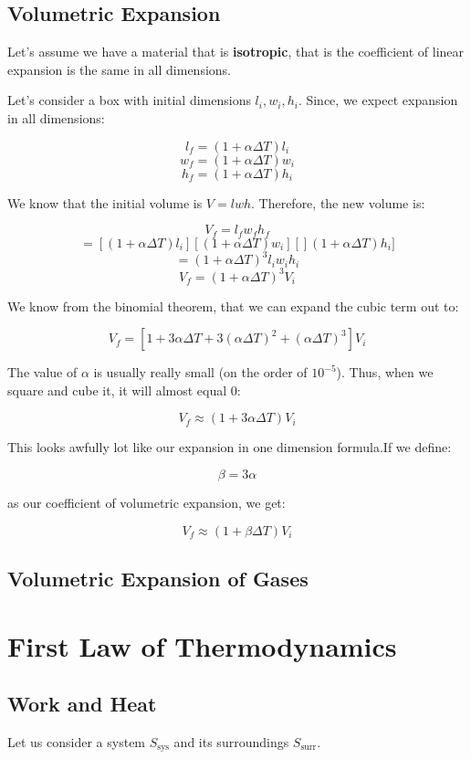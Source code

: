 \documentclass{report}
\begin{document}
\section{Volumetric Expansion}
Let's assume we have a material that is \textbf{isotropic}, that is the coefficient of linear expansion is the same in all dimensions.

Let's consider a box with initial dimensions $l_i, w_i, h_i$. Since, we expect expansion in all dimensions:

$$l_f = (1+\alpha\Delta T)l_i$$
$$w_f = (1+\alpha\Delta T)w_i$$
$$h_f = (1+\alpha\Delta T)h_i$$


We know that the initial volume is $V = lwh$. Therefore, the new volume is:

$$V_f = l_fw_fh_f$$ 
$$= [(1+\alpha\Delta T)l_i][(1+\alpha\Delta T)w_i][](1+\alpha\Delta T)h_i]$$ 
$$= (1+\alpha\Delta T)^3l_iw_ih_i$$
$$V_f = (1+\alpha\Delta T)^3V_i$$

We know from the binomial theorem, that we can expand the cubic term out to:

$$V_f =  [1+3\alpha\Delta T + 3(\alpha\Delta T)^2 + (\alpha\Delta T)^3]V_i$$

The value of $\alpha$ is usually really small (on the order of $10^{-5}$). Thus, when we square and cube it, it will almost equal 0:

$$V_f \approx  (1+3\alpha\Delta T)V_i$$

This looks awfully lot like our expansion in one dimension formula.If we define:

$$\beta = 3\alpha$$

as our coefficient of volumetric expansion, we get:

$$V_f \approx  (1+\beta\Delta T)V_i$$

\section{Volumetric Expansion of Gases}








\chapter{First Law of Thermodynamics}
\section{Work and Heat}
Let us consider a system $S_\text{sys}$ and its surroundings $S_\text{surr}$.
\end{document}
